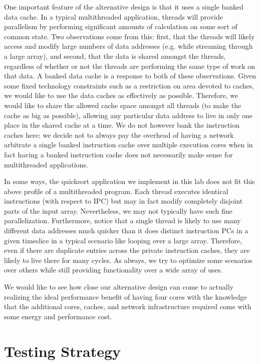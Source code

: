 \documentclass[10pt]{article}
\begin{document}
One important feature of the alternative design is that it uses a single banked data cache. In a typical multithreaded application, threads will provide parallelism by performing significant amounts of calculation on some sort of common state. Two observations come from this: first, that the threads will likely access and modify large numbers of data addresses (e.g. while streaming through a large array), and second, that the data is shared amongst the threads, regardless of whether or not the threads are performing the same type of work on that data. A banked data cache is a response to both of these observations. Given some fixed technology constraints such as a restriction on area devoted to caches, we would like to use the data caches as effectively as possible. Therefore, we would like to share the allowed cache space amongst all threads (to make the cache as big as possible), allowing any particular data address to live in only one place in the shared cache at a time. We do not however bank the instruction caches here; we decide not to always pay the overhead of having a network arbitrate a single banked instruction cache over multiple execution cores when in fact having a banked instruction cache does not necessarily make sense for multithreaded applications.

In some ways, the quicksort application we implement in this lab does not fit this above profile of a multithreaded program. Each thread executes identical instructions (with respect to IPC) but may in fact modify completely disjoint parts of the input array. Nevertheless, we may not typically have such fine parallelization. Furthermore, notice that a single thread is likely to use many different data addresses much quicker than it does distinct instruction PCs in a given timeslice in a typical scenario like looping over a large array. Therefore, even if there are duplicate entries across the private instruction caches, they are likely to live there for many cycles. As always, we try to optimize some scenarios over others while still providing functionality over a wide array of uses.

We would like to see how close our alternative design can come to actually realizing the ideal performance benefit of having four cores with the knowledge that the additional cores, caches, and network infrastructure required come with some energy and performance cost.


\section{Testing Strategy}
\end{document}
